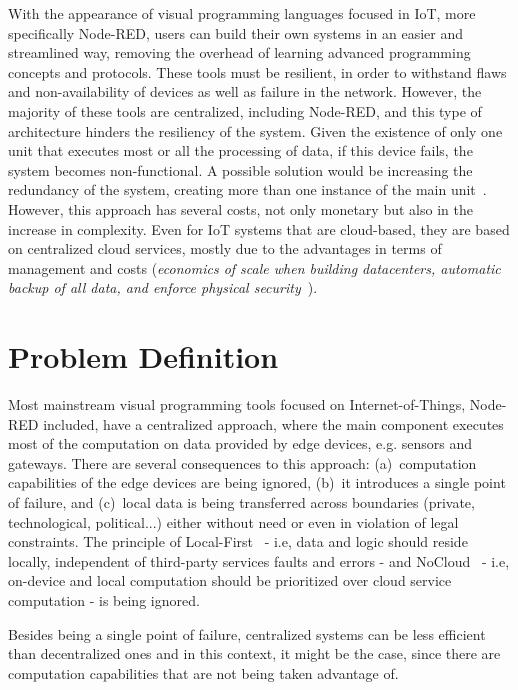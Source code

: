 With the appearance of visual programming languages focused in IoT, more specifically Node-RED, users can build their own systems in an easier and streamlined way, removing the overhead of learning advanced programming concepts and protocols. These tools must be resilient, in order to withstand flaws and non-availability of devices as well as failure in the network. However, the majority of these tools are centralized, including Node-RED, and this type of architecture hinders the resiliency of the system. Given the existence of only one unit that executes most or all the processing of data, if this device fails, the system becomes non-functional. A possible solution would be increasing the redundancy of the system, creating more than one instance of the main unit~\cite{SMARSLY20141}. However, this approach has several costs, not only monetary but also in the increase in complexity. Even for IoT systems that are cloud-based, they are based on centralized cloud services, mostly due to the advantages in terms of management and costs (\eg \textit{economics of scale when building datacenters, automatic backup of all data, and enforce physical security}~\cite{Want15}).

\section{Problem Definition} \label{sec:problem_definition}

Most mainstream visual programming tools focused on Internet-of-Things, Node-RED included, have a centralized approach, where the main component executes most of the computation on data provided by edge devices, e.g. sensors and gateways. There are several consequences to this approach: (a)~computation capabilities of the edge devices are being ignored, (b)~it introduces a single point of failure, and (c)~local data is being transferred across boundaries (private, technological, political...) either without need or even in violation of legal constraints. The principle of Local-First~\cite{localfist} - i.e, data and logic should reside locally, independent of third-party services faults and errors - and NoCloud~\cite{nocloud} - i.e, on-device and local computation should be prioritized over cloud service computation - is being ignored. 

Besides being a single point of failure, centralized systems can be less efficient than decentralized ones and in this context, it might be the case, since there are computation capabilities that are not being taken advantage of.

